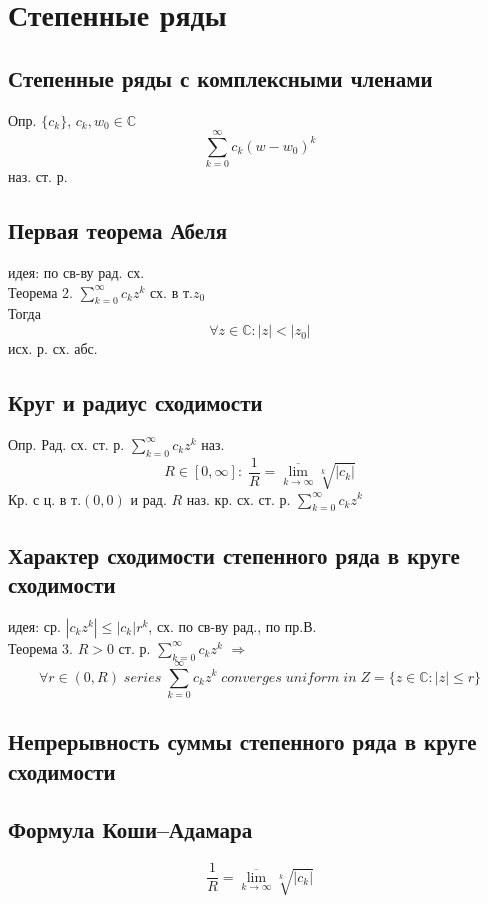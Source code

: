 \documentclass{article}
\begin{document}
\newpage
\section{Степенные ряды}
\subsection{Степенные ряды с комплексными членами}
Опр. $\{ c_k \}$, $c_k, w_0 \in \mathbb C$
\begin{equation*}
    \sum_{k=0}^\infty c_k (w-w_0)^k
\end{equation*}
наз. ст. р.
\subsection{Первая теорема Абеля}
идея: по св-ву рад. сх. \\
Теорема 2. $\sum_{k=0}^\infty c_k z^k$ сх. в т.$z_0$ \\
Тогда
\begin{equation*}
    \forall z \in \mathbb C: |z| < |z_0|
\end{equation*}
исх. р. сх. абс.
\subsection{Круг и радиус сходимости}
Опр. Рад. сх. ст. р. $\sum_{k=0}^\infty c_k z^k$ наз.
\begin{equation*}
    R \in [0, \infty]: \; \frac{1}{R} = \underset{k \rightarrow \infty}{\overline{\lim}} \sqrt[k]{|c_k|}
\end{equation*}
Кр. с ц. в т.$(0,0)$ и рад. $R$ наз. кр. сх. ст. р. $\sum_{k=0}^\infty c_k z^k$
\subsection{Характер сходимости степенного ряда в круге сходимости}
идея: ср. $|c_k z^k| \leq |c_k| r^k$, сх. по св-ву рад., по пр.В.\\
Теорема 3. $R>0$ ст. р. $\sum_{k=0}^\infty c_k z^k$ $\Rightarrow$
\begin{equation*}
    \forall r \in (0, R) \; series \; \sum_{k=0}^\infty c_k z^k \; converges \; uniform \; in \; Z = \{ z \in \mathbb C: |z| \leq r \}
\end{equation*}
\subsection{Непрерывность суммы степенного ряда в круге сходимости}
\subsection{Формула Коши–Адамара}
\begin{equation*}
    \frac{1}{R} = \underset{k \rightarrow \infty}{\overline{\lim}} \sqrt[k]{|c_k|}
\end{equation*}
\end{document}
